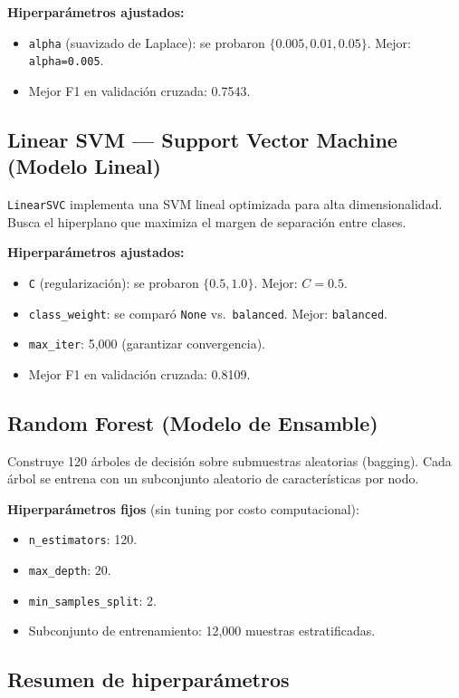 ﻿\documentclass[12pt,a4paper]{article}
\begin{document}
\textbf{Hiperparámetros ajustados:}
\begin{itemize}
  \item \texttt{alpha} (suavizado de Laplace): se probaron
        $\{0.005, 0.01, 0.05\}$. Mejor: \texttt{alpha=0.005}.
  \item Mejor F1 en validación cruzada: 0.7543.
\end{itemize}

\subsection{Linear SVM --- Support Vector Machine (Modelo Lineal)}
\texttt{LinearSVC} implementa una SVM lineal optimizada para alta
dimensionalidad. Busca el hiperplano que maximiza el margen de
separación entre clases.

\textbf{Hiperparámetros ajustados:}
\begin{itemize}
  \item \texttt{C} (regularización): se probaron $\{0.5, 1.0\}$.
        Mejor: $C=0.5$.
  \item \texttt{class\_weight}: se comparó \texttt{None} vs.\
        \texttt{balanced}. Mejor: \texttt{balanced}.
  \item \texttt{max\_iter}: 5,000 (garantizar convergencia).
  \item Mejor F1 en validación cruzada: 0.8109.
\end{itemize}

\subsection{Random Forest (Modelo de Ensamble)}
Construye 120 árboles de decisión sobre submuestras aleatorias
(bagging). Cada árbol se entrena con un subconjunto aleatorio de
características por nodo.

\textbf{Hiperparámetros fijos} (sin tuning por costo computacional):
\begin{itemize}
  \item \texttt{n\_estimators}: 120.
  \item \texttt{max\_depth}: 20.
  \item \texttt{min\_samples\_split}: 2.
  \item Subconjunto de entrenamiento: 12,000 muestras estratificadas.
\end{itemize}

\subsection{Resumen de hiperparámetros}
\end{document}
